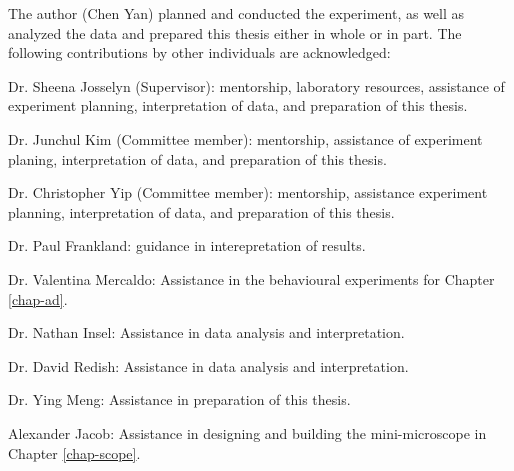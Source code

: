 The author (Chen Yan) planned and conducted the experiment, as well as analyzed the data and prepared this thesis either in whole or in part. The following contributions by other individuals are acknowledged:


Dr. Sheena Josselyn (Supervisor): mentorship, laboratory resources, assistance of experiment planning, interpretation of data, and preparation of this thesis.

Dr. Junchul Kim (Committee member): mentorship, assistance of experiment planing, interpretation of data, and preparation of this thesis.

Dr. Christopher Yip (Committee member): mentorship, assistance experiment planning, interpretation of data, and preparation of this thesis. 

Dr. Paul Frankland: guidance in interepretation of results.

Dr. Valentina Mercaldo: Assistance in the behavioural experiments for Chapter \ref{chap-ad}.

Dr. Nathan Insel: Assistance in data analysis and interpretation.

Dr. David Redish: Assistance in data analysis and interpretation. 

Dr. Ying Meng: Assistance in preparation of this thesis. 

Alexander Jacob: Assistance in designing and building the mini-microscope in Chapter \ref{chap-scope}.
